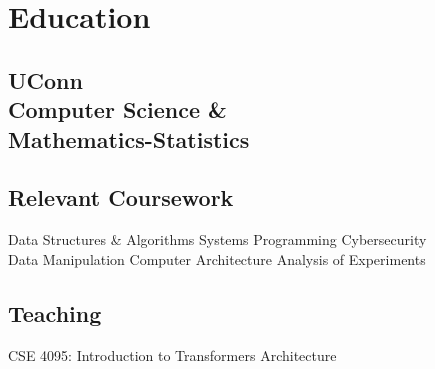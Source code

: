 \documentclass[]{resume-template}
\begin{document}
%
%
    \lastupdated{}

%
%

%
%

    \begin{minipage}[t]{0.33\textwidth}


        \section{Education}\label{sec:education}

        \subsection{UConn\\ Computer Science \&\\
        Mathematics-Statistics}\label{subsec:uconn}
        \vspace{\topsep}

        \subsection{Relevant Coursework}\label{subsec:coursework}
        Data Structures \& Algorithms \textbullet{} Systems Programming \textbullet{} Cybersecurity \textbullet{}\\ Data Manipulation \textbullet{}
        Computer Architecture \textbullet{} Analysis of Experiments
        \sectionsep{}

        \subsection{Teaching}\label{subsec:teaching}
        CSE 4095: Introduction to Transformers Architecture




\end{minipage}
\end{document}
